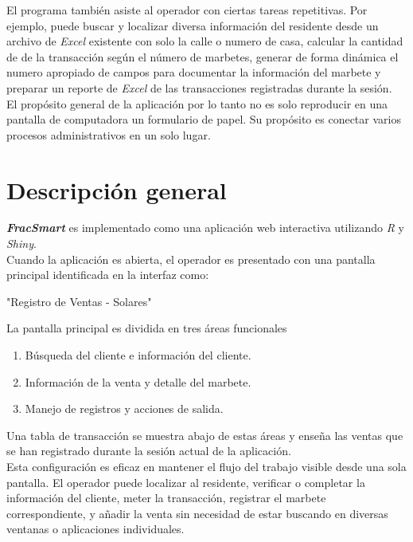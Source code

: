 \documentclass{article}
\begin{document}
\quad\quad El programa también asiste al operador con ciertas tareas repetitivas. Por ejemplo, puede buscar y localizar diversa información del residente desde un archivo de \textit{Excel} existente con solo la calle o numero de casa, calcular la cantidad de de la transacción según el número de marbetes, generar de forma dinámica el numero apropiado de campos para documentar la información del marbete y preparar un reporte de \textit{Excel} de las transacciones registradas durante la sesión. \\

\quad\quad El propósito general de la aplicación por lo tanto no es solo reproducir en una pantalla de computadora un formulario de papel. Su propósito es conectar varios procesos administrativos en un solo lugar.



\newpage
\section{Descripción general}
\quad\quad \textbf{\textit{FracSmart}} es implementado como una aplicación web interactiva utilizando \textit{R} y \textit{Shiny}. \\

\quad\quad Cuando la aplicación es abierta, el operador es presentado con una pantalla principal identificada en la interfaz como: 

\begin{center}
    "Registro de Ventas - Solares" 
\end{center}

\quad\quad La pantalla principal es dividida en tres áreas funcionales
\begin{enumerate}
    \item Búsqueda del cliente e información del cliente.
    \item Información de la venta y detalle del marbete.
    \item Manejo de registros y acciones de salida.
\end{enumerate}

\quad\quad Una tabla de transacción se muestra abajo de estas áreas y enseña las ventas que se han registrado durante la sesión actual de la aplicación.\\

\quad\quad Esta configuración es eficaz en mantener el flujo del trabajo visible desde una sola pantalla. El operador puede localizar al residente, verificar o completar la información del cliente, meter la transacción, registrar el marbete correspondiente, y añadir la venta sin necesidad de estar buscando en diversas ventanas o aplicaciones individuales.\\
\end{document}
